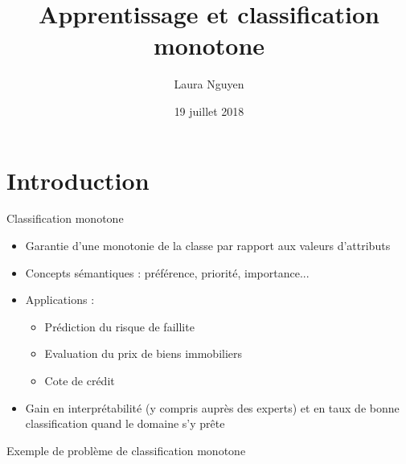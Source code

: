 \documentclass{beamer}
\title[Classification monotone]{Apprentissage et classification monotone}
\author{Laura Nguyen}
\institute{LFI}
\date{19 juillet 2018}
\newcommand{\beamcite}[1]{\hfill {\footnotesize \textcite{#1}}}
\begin{document}
\begin{frame}
  \titlepage
\end{frame}


\section{Introduction}

\begin{frame}{Classification monotone}
\begin{itemize}
\item Garantie d'une monotonie de la classe par rapport aux valeurs d'attributs
\item Concepts sémantiques : préférence, priorité, importance...
\item Applications : 
    \begin{itemize}
        \item Prédiction du risque de faillite
        \item Evaluation du prix de biens immobiliers
        \item Cote de crédit 
    \end{itemize}
\item Gain en interprétabilité (y compris auprès des experts) et en taux de bonne classification quand le domaine s'y prête\beamcite{pazzani-acceptance}
\end{itemize}
\end{frame}

\begin{frame}{Exemple de problème de classification monotone}
\beamcite{potharst-classification-bank}

\begin{table}
\label{tab:bank-loan-dataset}
\end{table}

\end{frame}
\end{document}
